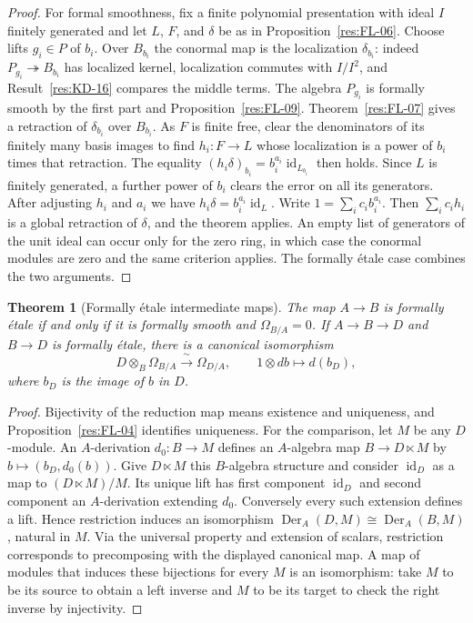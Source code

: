 \documentclass[11pt,oneside,openany]{book}
\newtheorem{theorem}{Theorem}[chapter]
\theoremstyle{definition}
\theoremstyle{remark}
\begin{document}
\begin{proof}
For formal smoothness, fix a finite polynomial presentation with ideal $I$
finitely generated and let $L$, $F$, and $\delta$ be as in
Proposition~\ref{res:FL-06}. Choose lifts $g_i\in P$ of $b_i$. Over $B_{b_i}$
the conormal map is the localization $\delta_{b_i}$: indeed
$P_{g_i}\twoheadrightarrow B_{b_i}$ has localized kernel, localization
commutes with $I/I^2$, and Result~\ref{res:KD-16} compares the middle terms.
The algebra $P_{g_i}$ is formally smooth by the first part and
Proposition~\ref{res:FL-09}. Theorem~\ref{res:FL-07} gives a retraction
of $\delta_{b_i}$ over $B_{b_i}$. As $F$ is finite free, clear the
denominators of its finitely many basis images to find $h_i:F\to L$ whose
localization is a power of $b_i$ times that retraction. The equality
$(h_i\delta)_{b_i}=b_i^{a_i}\operatorname{id}_{L_{b_i}}$ then holds.
Since $L$ is finitely generated, a further power of $b_i$ clears the error on
all its generators. After adjusting $h_i$ and $a_i$ we have
$h_i\delta=b_i^{a_i}\operatorname{id}_{L}$. Write $1=\sum_i c_i b_i^{a_i}$.
Then $\sum_i c_i h_i$ is a global retraction of $\delta$, and the theorem
applies. An empty list of generators of the unit ideal can occur only for
the zero ring, in which case the conormal modules are zero and the same
criterion applies. The formally \'{e}tale case combines the two arguments.
\end{proof}

\begin{theorem}[Formally \'{e}tale intermediate maps]\label{res:FL-11}
The map $A\to B$ is formally \'{e}tale if and only if it is formally smooth
and $\Omega_{B/A}=0$. If $A\to B\to D$ and $B\to D$ is formally \'{e}tale,
there is a canonical isomorphism
\[
  D\otimes_B\Omega_{B/A}\xrightarrow{\ \sim\ }\Omega_{D/A},
  \qquad 1\otimes db\longmapsto d(b_D),
\]
where $b_D$ is the image of $b$ in $D$.
\end{theorem}
\begin{proof}
Bijectivity of the reduction map means existence and uniqueness, and
Proposition~\ref{res:FL-04} identifies uniqueness. For the comparison,
let $M$ be any $D$-module. An $A$-derivation $d_0:B\to M$ defines an
$A$-algebra map $B\to D\ltimes M$ by $b\mapsto(b_D,d_0(b))$.
Give $D\ltimes M$ this $B$-algebra structure and consider
$\operatorname{id}_D$ as a map to $(D\ltimes M)/M$. Its unique lift has
first component $\operatorname{id}_D$ and second component an $A$-derivation
extending $d_0$. Conversely every such extension defines a lift. Hence
restriction induces an isomorphism
$\operatorname{Der}_A(D,M)\cong\operatorname{Der}_A(B,M)$, natural in $M$.
Via the universal property and extension of scalars, restriction corresponds
to precomposing with the displayed canonical map. A map of modules that
induces these bijections for every $M$ is an isomorphism: take $M$ to be its
source to obtain a left inverse and $M$ to be its target to check the right
inverse by injectivity.
\end{proof}
\end{document}
